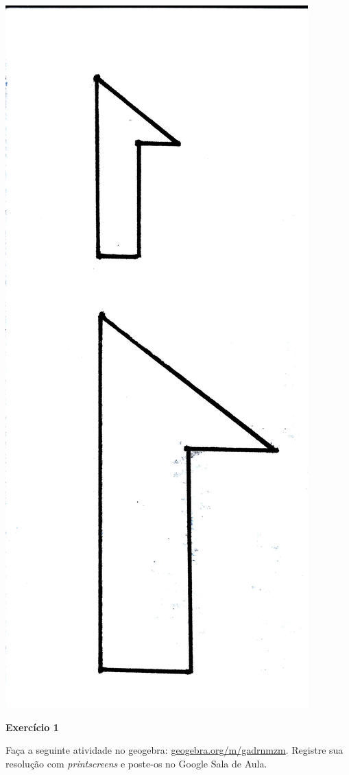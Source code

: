 \documentclass[twoside, 12pt]{article}
\begin{document}
\begin{center}
  \includegraphics[height=0.2\textheight]{img/03-4}
\end{center}

\begin{center}
\end{center}

\medskip
\textbf{Exercício 1}

Faça a seguinte atividade no geogebra: \url{geogebra.org/m/gadrnmzm}.
Registre sua resolução com \emph{printscreens} e poste-os no Google Sala
de Aula.
\end{document}
